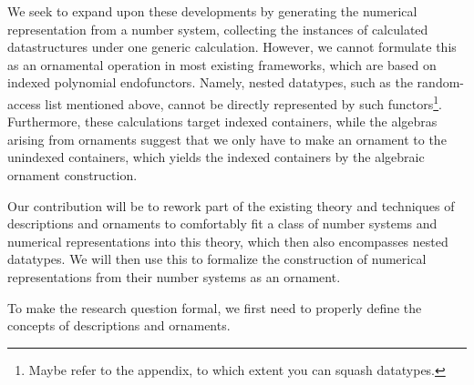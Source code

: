 We seek to expand upon these developments by generating the numerical representation from a number system, collecting the instances of calculated datastructures under one generic calculation. However, we cannot formulate this as an ornamental operation in most existing frameworks, which are based on indexed polynomial endofunctors. Namely, nested datatypes, such as the random-access list mentioned above, cannot be directly represented by such functors\footnote{Maybe refer to the appendix, to which extent you can squash datatypes.}. Furthermore, these calculations target indexed containers, while the algebras arising from ornaments suggest that we only have to make an ornament to the unindexed containers, which yields the indexed containers by the algebraic ornament construction.

Our contribution will be to rework part of the existing theory and techniques of descriptions and ornaments to comfortably fit a class of number systems and numerical representations into this theory, which then also encompasses nested datatypes. We will then use this to formalize the construction of numerical representations from their number systems as an ornament.

To make the research question formal, we first need to properly define the concepts of descriptions and ornaments.


